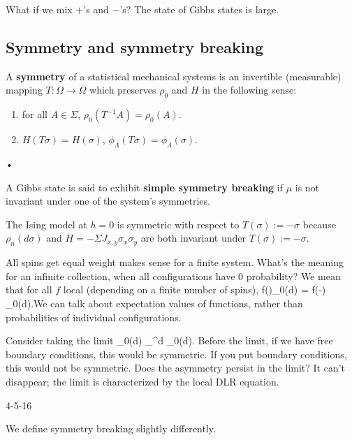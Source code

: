 \documentclass[12pt]{book}
\theoremstyle{norm}
\begin{document}
What if we mix $+$'s and $-$'s? The state of Gibbs states is large. 

\subsection{Symmetry and symmetry breaking}

\begin{definition}
A \textbf{symmetry} of a statistical mechanical systems is an invertible (measurable) mapping $T:\Omega\to \Omega$ which preserves $\rho_0$ and $H$ in the following sense:
\begin{enumerate}
\item
for all $A \in \Sigma$, $\rho_0(T^{-1}A)=\rho_0(A)$.
\item
$H(T\sigma)=H(\sigma)$, $\phi_{\Lambda}(T\sigma) = \phi_{\Lambda}(\sigma)$.
\end{enumerate}•
\end{definition}
\begin{definition}
A Gibbs state is said to exhibit \textbf{simple symmetry breaking} if $\mu$ is not invariant under one of the system's symmetries. %
\end{definition}
\begin{example}
The Ising model at $h=0$ is symmetric with respect to $T(\sigma):=-\sigma$ %
because $\rho_n(d\sigma)$ and $H=-\Sigma J_{x,y} \sigma_x\sigma_y$ are both invariant under $T(\sigma):=-\sigma$. 
\end{example}

All spins get equal weight makes sense for a finite system. What's the meaning for an infinite collection, when all configurations have 0 probability? We mean that for all $f$ local (depending on a finite number of spins), \be\int f(\sigma)\rho_0(d\sigma) = \int f(-\sigma) \rho_0(d\sigma).\ee We can talk about expectation values of functions, rather than probabilities of individual configurations.

Consider taking the limit
\be
\rho_0(d\sigma) \mapsto \lim_{\Lambda \nearrow {}^d} \rho_0(d\sigma).
\ee
{\color{red}Before the limit, if we have free boundary conditions, this would be symmetric. If you put boundary conditions, this would not be symmetric. Does the asymmetry persist in the limit? It can't disappear; the limit is characterized by the local DLR equation.}


{\color{blue}4-5-16}

We define symmetry breaking slightly differently.
\end{document}
